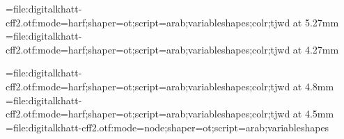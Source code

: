\edef\pdfcompresslevel{\pdfvariable compresslevel}
\edef\pdfobjcompresslevel{\pdfvariable objcompresslevel}
\edef\pdfgentounicode{\pdfvariable gentounicode}
\newattribute{\tajweedatt}
\newattribute{\sajdaatt}



\newbox\ayaframe
\newcount\suranum


\def\suraline#1{%
\global\advance\suranum by1%
\leavevmode\raise1.2em\hbox to 0pt{\pdfbookmark{\the\suranum. #1}{sura\the\suranum}}%
\hbox to 0pt{\copy\ayaframe\hss}\centerline{\medinasura\textdir TRT#1}%
}%
\def\bismline#1{\centerline{#1}}



\def\sajdabar#1{\setattribute{\sajdaatt}{1}#1\unsetattribute{\sajdaatt}\directlua{addsajdacallback()}%
}

\font\medinafontvar={file:digitalkhatt-cff2.otf:mode=harf;shaper=ot;script=arab;variableshapes;colr;tjwd} at 5.27mm
\font\medinafontvarmadina={file:digitalkhatt-cff2.otf:mode=harf;shaper=ot;script=arab;variableshapes;colr;tjwd} at 4.27mm

\font\medinasura={file:digitalkhatt-cff2.otf:mode=harf;shaper=ot;script=arab;variableshapes;colr;tjwd} at 4.8mm
\font\fatiha={file:digitalkhatt-cff2.otf:mode=harf;shaper=ot;script=arab;variableshapes;colr;tjwd} at 4.5mm
\font\medinafontvarnode={file:digitalkhatt-cff2.otf:mode=node;shaper=ot;script=arab;variableshapes}

\renewcommand{\baselinestretch}{2.25}
\lineskiplimit=-100pt

\parindent=0pt
\parfillskip=0pt

\def\topglue{\nointerlineskip \vglue-\topskip \vglue}

\def\ayagraphic{\centerline{\lower1em\hbox{\texttt{[image: ayaframe.pdf]}}}}

